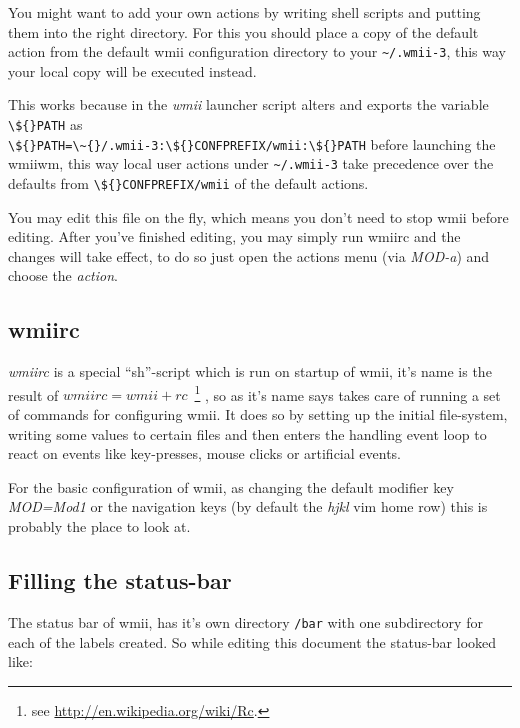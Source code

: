 \documentclass[12pt,a4paper]{article} %
\newcommand{\hrefx}[1]{\href{#1}{#1}} %
\begin{document}
    You might want to add your own actions by writing shell scripts
    and putting them into the right directory.  For this you should
    place a copy of the default action from the default wmii
    configuration directory to your \texttt{\~{}/.wmii-3}, this way
    your local copy will be executed instead.
    
    This works because in the \emph{wmii} launcher script alters and
    exports the variable \verb+\${}PATH+ as\\
    \verb+\${}PATH=\~{}/.wmii-3:\${}CONFPREFIX/wmii:\${}PATH+ before
    launching the wmiiwm, this way local user actions under
    \verb+~/.wmii-3+ take precedence over the defaults from
    \verb+\${}CONFPREFIX/wmii+ of the default actions.
    
    You may edit this file on the fly, which means you don't need to
    stop wmii before editing. After you've finished editing, you may
    simply run wmiirc and the changes will take effect, to do so just
    open the actions menu (via \emph{MOD-a}) and choose the
    \emph{action}.

  \subsection{wmiirc}
  
    \emph{wmiirc} is a special ``sh''-script which is run on startup
    of wmii, it's name is the result of ${}wmiirc=wmii+rc$~\footnote{
    see \hrefx{http://en.wikipedia.org/wiki/Rc}.}  , so as it's name
    says takes care of running a set of commands for configuring
    wmii. It does so by setting up the initial file-system, writing
    some values to certain files and then enters the handling event
    loop to react on events like key-presses, mouse clicks or
    artificial events.
    
    For the basic configuration of wmii, as changing the default
    modifier key \emph{MOD=Mod1} or the navigation keys (by default
    the \emph{hjkl} vim home row) this is probably the place to look
    at.

  \subsection{Filling the status-bar}

    \label{subsec:status}
    The status bar of wmii, has it's own directory \verb+/bar+ with
    one subdirectory for each of the labels created. So while editing
    this document the status-bar looked like:
\end{document}
